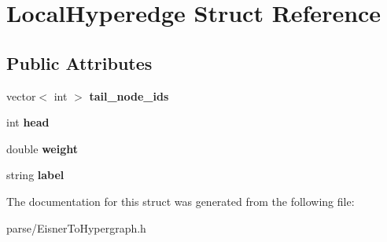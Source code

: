 \hypertarget{structLocalHyperedge}{
\section{LocalHyperedge Struct Reference}
\label{structLocalHyperedge}
}
\subsection*{Public Attributes}
\begin{DoxyCompactItemize}
\item 
\hypertarget{structLocalHyperedge_a94cbc62434996702ca1d0e28b6dde622}{
vector$<$ int $>$ {\bfseries tail\_\-node\_\-ids}}
\label{structLocalHyperedge_a94cbc62434996702ca1d0e28b6dde622}

\item 
\hypertarget{structLocalHyperedge_a71c8831cc00fefbfb29575856a22fc8a}{
int {\bfseries head}}
\label{structLocalHyperedge_a71c8831cc00fefbfb29575856a22fc8a}

\item 
\hypertarget{structLocalHyperedge_a875e26d7749b13e387b7f0978a4f97a5}{
double {\bfseries weight}}
\label{structLocalHyperedge_a875e26d7749b13e387b7f0978a4f97a5}

\item 
\hypertarget{structLocalHyperedge_ae1b43e113b237128ed95691034ec715e}{
string {\bfseries label}}
\label{structLocalHyperedge_ae1b43e113b237128ed95691034ec715e}

\end{DoxyCompactItemize}


The documentation for this struct was generated from the following file:\begin{DoxyCompactItemize}
\item 
parse/EisnerToHypergraph.h\end{DoxyCompactItemize}
